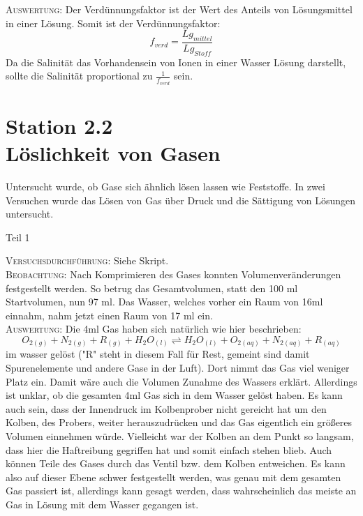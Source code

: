 \documentclass[11pt, a4paper]{article}
\begin{document}
\textsc{Auswertung:}\hspace{8mm} 
Der Verdünnungsfaktor ist der Wert des Anteils von Lösungsmittel in einer Lösung. Somit ist der Verdünnungsfaktor: $$\displaystyle{f_{verd} = \frac{Lg_{mittel}}{Lg_{Stoff}}}$$ Da die Salinität das Vorhandensein von Ionen in einer Wasser Lösung darstellt, sollte die Salinität proportional zu $\frac{1}{f_{verd}}$ sein. 


\section*{Station 2.2\\Löslichkeit von Gasen}

Untersucht wurde, ob Gase sich ähnlich lösen lassen wie Feststoffe. In zwei Versuchen wurde das Lösen von Gas über Druck und die Sättigung von Lösungen untersucht.

	\begin{center}
	Teil 1
	\end{center}

\textsc{Versuchsdurchführung:} Siehe Skript.\\

\textsc{Beobachtung:}\hspace{5mm} Nach Komprimieren des Gases konnten Volumenveränderungen festgestellt werden. So betrug das Gesamtvolumen, statt den 100 ml Startvolumen, nun 97 ml. Das Wasser, welches vorher ein Raum von 16ml einnahm, nahm jetzt einen Raum von 17 ml ein.\\
\textsc{Auswertung:}\hspace{8mm} Die 4ml Gas haben sich natürlich wie hier beschrieben: $$O_{2(g)} + N_{2(g)} + R_{(g)} + H_2O_{(l)} \rightleftharpoons H_2O_{(l)} + O_{2(aq)} + N_{2(aq)} + R_{(aq)}$$ im wasser gelöst ("R" steht in diesem Fall für Rest, gemeint sind damit Spurenelemente und andere Gase in der Luft). Dort nimmt das Gas viel weniger Platz ein. Damit wäre auch die Volumen Zunahme des Wassers erklärt. Allerdings ist unklar, ob die gesamten 4ml Gas sich in dem Wasser gelöst haben. Es kann auch sein, dass der Innendruck im Kolbenprober nicht gereicht hat um den Kolben, des Probers, weiter herauszudrücken und das Gas eigentlich ein größeres Volumen einnehmen würde. Vielleicht war der Kolben an dem Punkt so langsam, dass hier die Haftreibung gegriffen hat und somit einfach stehen blieb. Auch können Teile des Gases durch das Ventil bzw. dem Kolben entweichen. Es kann also auf dieser Ebene schwer festgestellt werden, was genau mit dem gesamten Gas passiert ist, allerdings kann gesagt werden, dass wahrscheinlich das meiste an Gas in Lösung mit dem Wasser gegangen ist. 
\end{document}
